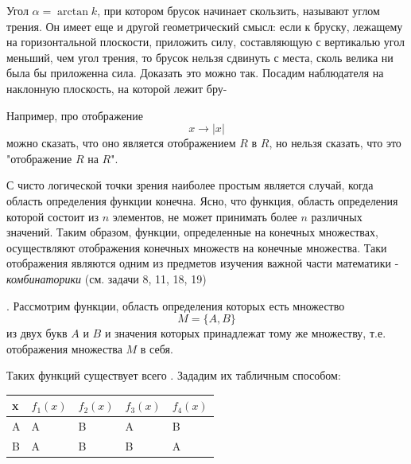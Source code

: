 \begin{minipage}{0.45\textwidth}
Угол $\alpha = \arctan k$, при котором брусок начинает скользить, называют углом трения. Он имеет еще и другой геометрический смысл: если к бруску, лежащему на горизонтальной плоскости, приложить силу, составляющую с вертикалью угол меньший, чем угол трения, то брусок нельзя сдвинуть с места, сколь велика ни была бы приложенна сила. Доказать это можно так. Посадим наблюдателя на наклонную плоскость, на которой лежит бру-
\end{minipage}
\begin{spacing}{1.5}
Например, про отображение
$$
x \to |x|
$$
можно сказать, что оно является отображением $R$ в $R$, но нельзя сказать, что это "отображение $R$ на $R$".

С чисто логической точки зрения наиболее простым является случай, когда область определения функции конечна. Ясно, что функция, область определения которой состоит из $n$ элементов, не может принимать более $n$ различных значений. Таким образом, функции, определенные на конечных множествах, осуществляют отображения конечных множеств на конечные множества. Таки отображения являются одним из предметов изучения важной части математики - \textit{комбинаторики} (см. задачи 8, 11, 18, 19)

. Рассмотрим функции, область определения которых есть множество
$$
M = \{A, B\}
$$
из двух букв $A$ и $B$ и значения которых принадлежат тому же множеству, т.е. отображения множества $M$ в себя.

Таких функций существует всего . Зададим их табличным способом:
\end{spacing}
\begin{center}
\begin{tabular}{ | l | l | l | l |l |}
\hline
x& $f_1 (x)$ & $f_2 (x)$ & $f_3 (x)$ & $f_4 (x)$ \\ \hline
A & A & B & A & B \\
B & A & B & B & A \\
\hline
\end{tabular}
\end{center}